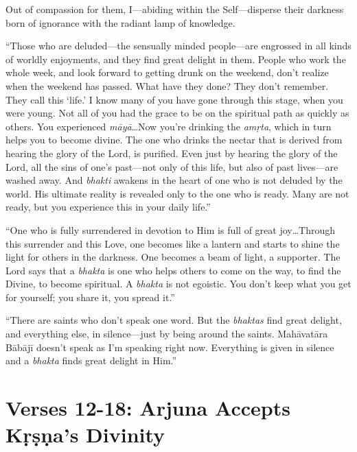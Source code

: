 {Out of compassion for them, I---abiding within the Self---disperse their darkness born of ignorance with the radiant lamp of knowledge.}

\enquote{Those who are deluded---the sensually minded people---are engrossed in all kinds of worldly enjoyments, and they find great delight in them. People who work the whole week, and look forward to getting drunk on the weekend, don’t realize when the weekend has passed. What have they done? They don’t remember. They call this \enquote{life.} I know many of you have gone through this stage, when you were young. Not all of you had the grace to be on the spiritual path as quickly as others. You experienced \textit{māyā}\ldots Now you’re drinking the \textit{amṛta}, which in turn helps you to become divine. The one who drinks the nectar that is derived from hearing the glory of the Lord, is purified. Even just by hearing the glory of the Lord, all the sins of one’s past---not only of this life, but also of past lives---are washed away. And \textit{bhakti} awakens in the heart of one who is not deluded by the world. His ultimate reality is revealed only to the one who is ready. Many are not ready, but you experience this in your daily life.}

\enquote{One who is fully surrendered in devotion to Him is full of great joy\ldots Through this surrender and this Love, one becomes like a lantern and starts to shine the light for others in the darkness. One becomes a beam of light, a supporter. The Lord says that a \textit{bhakta} is one who helps others to come on the way, to find the Divine, to become spiritual. A \textit{bhakta} is not egoistic. You don’t keep what you get for yourself; you share it, you spread it.}

\enquote{There are saints who don’t speak one word. But the \textit{bhaktas} find great delight, and everything else, in silence---just by being around the saints. Mahāvatāra Bābājī doesn’t speak as I’m speaking right now. Everything is given in silence and a \textit{bhakta} finds great delight in Him.}

\newpage
\section{Verses 12-18: Arjuna Accepts Kṛṣṇa's Divinity}\label{sec-verses-12-18-arjuna-accepts-krsna-s-divinity}

